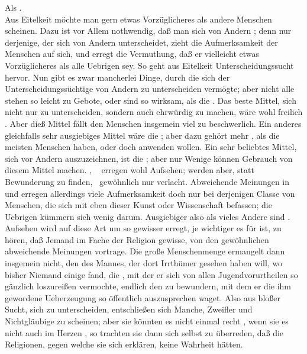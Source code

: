 \begin{aufza}
\begin{aufzb} 
\item Als .\\
Aus Eitelkeit möchte man gern etwas Vorzüglicheres als andere Menschen scheinen. Dazu ist vor Allem nothwendig, daß man sich von Andern ; denn nur derjenige, der sich von Andern unterscheidet, zieht die Aufmerksamkeit der Menschen auf sich, und erregt die Vermuthung, daß er vielleicht etwas Vorzüglicheres als alle Uebrigen sey. So geht aus Eitelkeit Unterscheidungssucht hervor. Nun gibt es zwar mancherlei Dinge, durch die sich der Unterscheidungssüchtige von Andern zu unterscheiden vermögte; aber nicht alle stehen so leicht zu Gebote, oder sind so wirksam, als die . Das beste Mittel, sich nicht nur zu unterscheiden, sondern auch ehrwürdig zu machen, wäre wohl freilich . Aber dieß Mittel fällt den Menschen insgemein viel zu beschwerlich. Ein anderes gleichfalls sehr ausgiebiges Mittel wäre die ; aber dazu gehört mehr , als die meisten Menschen haben, oder doch anwenden wollen. Ein sehr beliebtes Mittel, sich vor Andern auszuzeichnen, ist die ; aber nur Wenige können Gebrauch von diesem Mittel machen. , \udgl\ 
erregen wohl Aufsehen; werden aber, statt Bewunderung zu finden,~ gewöhnlich nur verlacht. Abweichende Meinungen in  und  erregen allerdings viele Aufmerksamkeit doch nur bei derjenigen Classe von Menschen, die sich mit eben dieser Kunst oder Wissenschaft befassen; die Uebrigen kümmern sich wenig darum. Ausgiebiger also als vieles Andere sind . Aufsehen wird auf diese Art um so gewisser erregt, je wichtiger es für  ist, zu hören, daß Jemand im Fache der Religion gewisse, von den gewöhnlichen abweichende Meinungen vortrage. Die große Menschenmenge ermangelt dann insgemein nicht, den  des Mannes, der dort Irrthümer gesehen haben will, wo bisher Niemand einige fand, die , mit der er sich von allen Jugendvorurtheilen so gänzlich loszureißen vermochte, endlich den  zu bewundern, mit dem er die ihm gewordene Ueberzeugung so öffentlich auszusprechen waget. Also aus bloßer Sucht, sich zu unterscheiden, entschließen sich Manche, Zweifler und Nichtgläubige zu scheinen; aber sie könnten es nicht einmal recht , wenn sie es nicht auch im Herzen , so trachten sie dann sich selbst zu überreden, daß die Religionen, gegen welche sie sich erklären, keine Wahrheit hätten.

\end{aufzb}
\end{aufza}
